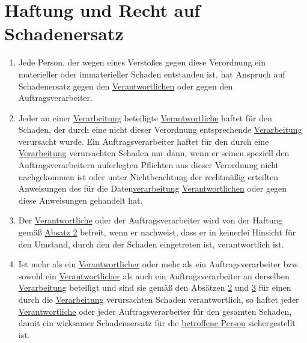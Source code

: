 \chapter{Haftung und Recht auf Schadenersatz}
\label{ch:82}


\begin{enumerate}

  \item Jede Person, der wegen eines Verstoßes gegen diese Verordnung ein materieller oder immaterieller Schaden
   entstanden ist, hat Anspruch auf Schadenersatz gegen den \hyperref[itm:04-7]{Verantwortlichen} oder gegen den Auftragsverarbeiter.
  \label{itm:82-1}

  \item Jeder an einer \hyperref[itm:04-2]{Verarbeitung} beteiligte \hyperref[itm:04-7]{Verantwortliche} haftet für den Schaden, der durch eine nicht dieser
   Verordnung entsprechende \hyperref[itm:04-2]{Verarbeitung} verursacht wurde. Ein Auftragsverarbeiter haftet für den durch eine
   \hyperref[itm:04-2]{Verarbeitung} verursachten Schaden nur dann, wenn er seinen speziell den Auftragsverarbeitern auferlegten Pflichten
   aus dieser Verordnung nicht nachgekommen ist oder unter Nichtbeachtung der rechtmäßig erteilten Anweisungen des für
   die Daten\hyperref[itm:04-2]{verarbeitung} \hyperref[itm:04-7]{Verantwortlichen} oder gegen diese Anweisungen gehandelt hat.
  \label{itm:82-2}

  \item Der \hyperref[itm:04-7]{Verantwortliche} oder der Auftragsverarbeiter wird von der Haftung gemäß \hyperref[itm:82-2]{Absatz 2}
   befreit, wenn er nachweist, dass er in keinerlei Hinsicht für den Umstand, durch den der Schaden eingetreten ist,
   verantwortlich ist.
  \label{itm:82-3}

  \item Ist mehr als ein \hyperref[itm:04-7]{Verantwortlicher} oder mehr als ein Auftragsverarbeiter bzw. sowohl ein \hyperref[itm:04-7]{Verantwortlicher} als
   auch ein Auftragsverarbeiter an derselben \hyperref[itm:04-2]{Verarbeitung} beteiligt und sind sie gemäß den Absätzen \hyperref[itm:82-2]
   {2} und \hyperref[itm:82-3]{3} für einen durch die \hyperref[itm:04-2]{Verarbeitung} verursachten Schaden verantwortlich, so haftet jeder
   \hyperref[itm:04-7]{Verantwortliche} oder jeder Auftragsverarbeiter für den gesamten Schaden, damit ein wirksamer Schadensersatz für die
   \hyperref[itm:04-1]{betroffene Person} sichergestellt ist.
  \label{itm:82-4}


\end{enumerate}
